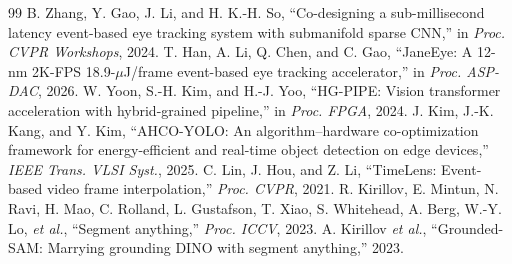 \documentclass[journal]{IEEEtran}
\newcommand{\etal}{\textit{et al.}}
\begin{document}
\begin{thebibliography}{99}
 B. Zhang, Y. Gao, J. Li, and H. K.-H. So, ``Co-designing a sub-millisecond latency event-based eye tracking system with submanifold sparse CNN,'' in \emph{Proc. CVPR Workshops}, 2024.
 T. Han, A. Li, Q. Chen, and C. Gao, ``JaneEye: A 12-nm 2K-FPS 18.9-$\mu$J/frame event-based eye tracking accelerator,'' in \emph{Proc. ASP-DAC}, 2026.
 W. Yoon, S.-H. Kim, and H.-J. Yoo, ``HG-PIPE: Vision transformer acceleration with hybrid-grained pipeline,'' in \emph{Proc. FPGA}, 2024.
 J. Kim, J.-K. Kang, and Y. Kim, ``AHCO-YOLO: An algorithm--hardware co-optimization framework for energy-efficient and real-time object detection on edge devices,'' \emph{IEEE Trans. VLSI Syst.}, 2025.
 C. Lin, J. Hou, and Z. Li, ``TimeLens: Event-based video frame interpolation,'' \emph{Proc. CVPR}, 2021.
 R. Kirillov, E. Mintun, N. Ravi, H. Mao, C. Rolland, L. Gustafson, T. Xiao, S. Whitehead, A. Berg, W.-Y. Lo, \etal, ``Segment anything,'' \emph{Proc. ICCV}, 2023.
 A. Kirillov \etal, ``Grounded-SAM: Marrying grounding DINO with segment anything,'' 2023.
\end{thebibliography}
\end{document}
